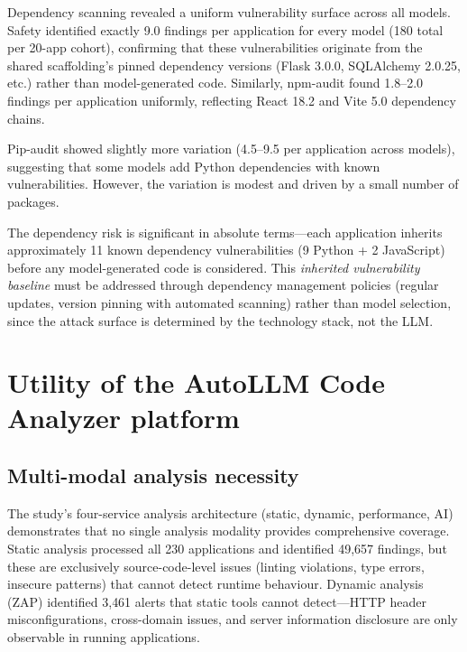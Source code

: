 Dependency scanning revealed a uniform vulnerability surface across all models. Safety identified exactly 9.0 findings per application for every model (180 total per 20-app cohort), confirming that these vulnerabilities originate from the shared scaffolding's pinned dependency versions (Flask 3.0.0, SQLAlchemy 2.0.25, etc.) rather than model-generated code. Similarly, npm-audit found 1.8--2.0 findings per application uniformly, reflecting React 18.2 and Vite 5.0 dependency chains.

Pip-audit showed slightly more variation (4.5--9.5 per application across models), suggesting that some models add Python dependencies with known vulnerabilities. However, the variation is modest and driven by a small number of packages.

The dependency risk is significant in absolute terms---each application inherits approximately 11 known dependency vulnerabilities (9 Python + 2 JavaScript) before any model-generated code is considered. This \textit{inherited vulnerability baseline} must be addressed through dependency management policies (regular updates, version pinning with automated scanning) rather than model selection, since the attack surface is determined by the technology stack, not the LLM.

\section{Utility of the AutoLLM Code Analyzer platform}

\subsection{Multi-modal analysis necessity}

The study's four-service analysis architecture (static, dynamic, performance, AI) demonstrates that no single analysis modality provides comprehensive coverage. Static analysis processed all 230 applications and identified 49{,}657 findings, but these are exclusively source-code-level issues (linting violations, type errors, insecure patterns) that cannot detect runtime behaviour. Dynamic analysis (ZAP) identified 3{,}461 alerts that static tools cannot detect---HTTP header misconfigurations, cross-domain issues, and server information disclosure are only observable in running applications.

